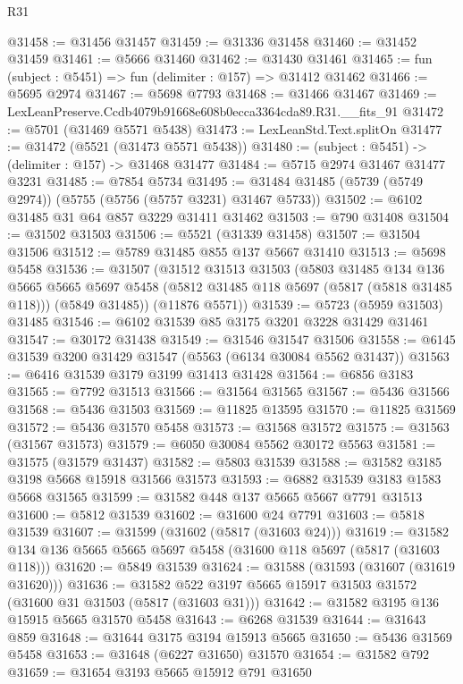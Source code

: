 \begin{lexlean}{R31}
\begin{coremodule}
@31458 := @31456 @31457
@31459 := @31336 @31458
@31460 := @31452 @31459
@31461 := @5666 @31460
@31462 := @31430 @31461
@31465 := fun (subject : @5451) => fun (delimiter : @157) => @31412 @31462
@31466 := @5695 @2974
@31467 := @5698 @7793
@31468 := @31466 @31467
@31469 := LexLeanPreserve.Ccdb4079b91668e608b0ecca3364cda89.R31.__fits_91
@31472 := @5701 (@31469 @5571 @5438)
@31473 := LexLeanStd.Text.splitOn
@31477 := @31472 (@5521 (@31473 @5571 @5438))
@31480 := (subject : @5451) -> (delimiter : @157) -> @31468 @31477
@31484 := @5715 @2974 @31467 @31477 @3231
@31485 := @7854 @5734
@31495 := @31484 @31485 (@5739 (@5749 @2974)) (@5755 (@5756 (@5757 @3231) @31467 @5733))
@31502 := @6102 @31485 @31 @64 @857 @3229 @31411 @31462
@31503 := @790 @31408
@31504 := @31502 @31503
@31506 := @5521 (@31339 @31458)
@31507 := @31504 @31506
@31512 := @5789 @31485 @855 @137 @5667 @31410
@31513 := @5698 @5458
@31536 := @31507
    (@31512
      @31513
      @31503
      (@5803
        @31485
        @134
        @136
        @5665
        @5665
        @5697
        @5458
        (@5812 @31485 @118 @5697 (@5817 (@5818 @31485 @118)))
        (@5849 @31485))
      (@11876 @5571))
@31539 := @5723 (@5959 @31503) @31485
@31546 := @6102 @31539 @85 @3175 @3201 @3228 @31429 @31461
@31547 := @30172 @31438
@31549 := @31546 @31547 @31506
@31558 := @6145 @31539 @3200 @31429 @31547 (@5563 (@6134 @30084 @5562 @31437))
@31563 := @6416 @31539 @3179 @3199 @31413 @31428
@31564 := @6856 @3183
@31565 := @7792 @31513
@31566 := @31564 @31565
@31567 := @5436 @31566
@31568 := @5436 @31503
@31569 := @11825 @13595
@31570 := @11825 @31569
@31572 := @5436 @31570 @5458
@31573 := @31568 @31572
@31575 := @31563 (@31567 @31573)
@31579 := @6050 @30084 @5562 @30172 @5563
@31581 := @31575 (@31579 @31437)
@31582 := @5803 @31539
@31588 := @31582 @3185 @3198 @5668 @15918 @31566 @31573
@31593 := @6882 @31539 @3183 @1583 @5668 @31565
@31599 := @31582 @448 @137 @5665 @5667 @7791 @31513
@31600 := @5812 @31539
@31602 := @31600 @24 @7791
@31603 := @5818 @31539
@31607 := @31599 (@31602 (@5817 (@31603 @24)))
@31619 := @31582 @134 @136 @5665 @5665 @5697 @5458 (@31600 @118 @5697 (@5817 (@31603 @118)))
@31620 := @5849 @31539
@31624 := @31588 (@31593 (@31607 (@31619 @31620)))
@31636 := @31582 @522 @3197 @5665 @15917 @31503 @31572 (@31600 @31 @31503 (@5817 (@31603 @31)))
@31642 := @31582 @3195 @136 @15915 @5665 @31570 @5458
@31643 := @6268 @31539
@31644 := @31643 @859
@31648 := @31644 @3175 @3194 @15913 @5665
@31650 := @5436 @31569 @5458
@31653 := @31648 (@6227 @31650) @31570
@31654 := @31582 @792
@31659 := @31654 @3193 @5665 @15912 @791 @31650

\end{coremodule}
\end{lexlean}
